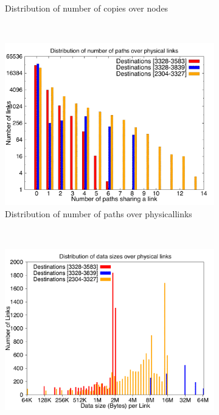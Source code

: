 \begin{figure}[!htbp]
\begin{subfigure}[b]{0.49\textwidth}
                \caption{Distribution of number of copies over nodes}
                \label{fig:incrsize_4k_copy}
        \end{subfigure}
        ~ %
        \begin{subfigure}[b]{0.49\textwidth}
                \includegraphics[width=\textwidth]{report_figures/incrsize/4k/loadpath_histo.pdf}
                \caption{Distribution of number of paths over physicallinks}
                \label{fig:incrsize_4k_loadpath}
        \end{subfigure}
        ~ %
        \begin{subfigure}[b]{0.49\textwidth}
                \includegraphics[width=\textwidth]{report_figures/incrsize/4k/loaddata_histo.pdf}

\end{subfigure}
\end{figure}

